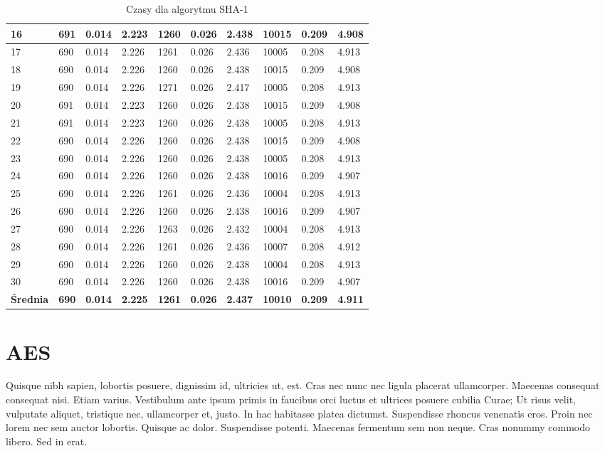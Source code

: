 \documentclass[oneside]{mgr}
\begin{document}
\begin{table}
\begin{tabularx}{\linewidth + 1}{|X|X|X|X|X|X|X|X|X|X|}
16 &	691	& 0.014 &	2.223 &	1260 &	0.026 &	2.438 &	10015 &	0.209 &	4.908 \\ \hline
17 &	690	& 0.014 &	2.226 &	1261 &	0.026 &	2.436 &	10005 &	0.208 &	4.913 \\ \hline
18 &	690	& 0.014 &	2.226 &	1260 &	0.026 &	2.438 &	10015 &	0.209 &	4.908 \\ \hline
19 &	690	& 0.014 &	2.226 &	1271 &	0.026 &	2.417 &	10005 &	0.208 &	4.913 \\ \hline
20 &	691	& 0.014 &	2.223 &	1260 &	0.026 &	2.438 &	10015 &	0.209 &	4.908 \\ \hline
21 &	691	& 0.014 &	2.223 &	1260 &	0.026 &	2.438 &	10005 &	0.208 &	4.913 \\ \hline
22 &	690	& 0.014 &	2.226 &	1260 &	0.026 &	2.438 &	10015 &	0.209 &	4.908 \\ \hline
23 &	690	& 0.014 &	2.226 &	1260 &	0.026 &	2.438 &	10005 &	0.208 &	4.913 \\ \hline
24 &	690	& 0.014 &	2.226 &	1260 &	0.026 &	2.438 &	10016 &	0.209 &	4.907 \\ \hline
25 &	690	& 0.014 &	2.226 &	1261 &	0.026 &	2.436 &	10004 &	0.208 &	4.913 \\ \hline
26 &	690	& 0.014 &	2.226 &	1260 &	0.026 &	2.438 &	10016 &	0.209 &	4.907 \\ \hline
27 &	690	& 0.014 &	2.226 &	1263 &	0.026 &	2.432 &	10004 &	0.208 &	4.913 \\ \hline
28 &	690	& 0.014 &	2.226 &	1261 &	0.026 &	2.436 &	10007 &	0.208 &	4.912 \\ \hline
29 &	690	& 0.014 &	2.226 &	1260 &	0.026 &	2.438 &	10004 &	0.208 &	4.913 \\ \hline
30 &	690	& 0.014 &	2.226 &	1260 &	0.026 &	2.438 &	10016 &	0.209 &	4.907 \\ \hline
\textbf{Średnia}	& \textbf{690} &	\textbf{0.014} &	\textbf{2.225} &	\textbf{1261} &	\textbf{0.026} &	\textbf{2.437} &	\textbf{10010} &	\textbf{0.209} & \textbf{4.911} \\ \hline
    \end{tabularx}
    \caption{Czasy dla algorytmu SHA-1}


\end{table}

\chapter{AES}
Quisque nibh sapien, lobortis posuere, dignissim id, ultricies ut,
est. Cras nec nunc nec ligula placerat ullamcorper. Maecenas consequat
consequat nisi. Etiam varius. Vestibulum ante ipsum primis in faucibus
orci luctus et ultrices posuere cubilia Curae; Ut risus velit,
vulputate aliquet, tristique nec, ullamcorper et, justo. In hac
habitasse platea dictumst. Suspendisse rhoncus venenatis eros. Proin
nec lorem nec sem auctor lobortis. Quisque ac dolor. Suspendisse
potenti. Maecenas fermentum sem non neque. Cras nonummy commodo
libero. Sed in erat.
\end{document}
